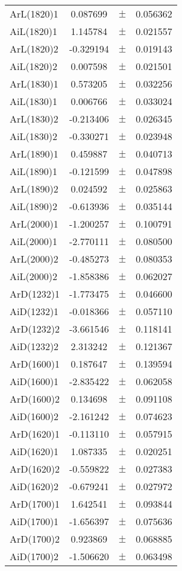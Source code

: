 \begin{table}
\begin{tiny}
\begin{tabular}{lccc}
ArL(1820)1 & 0.087699 & $\pm$ & 0.056362 \\
AiL(1820)1 & 1.145784 & $\pm$ & 0.021557 \\
ArL(1820)2 & -0.329194 & $\pm$ & 0.019143 \\
AiL(1820)2 & 0.007598 & $\pm$ & 0.021501 \\
ArL(1830)1 & 0.573205 & $\pm$ & 0.032256 \\
AiL(1830)1 & 0.006766 & $\pm$ & 0.033024 \\
ArL(1830)2 & -0.213406 & $\pm$ & 0.026345 \\
AiL(1830)2 & -0.330271 & $\pm$ & 0.023948 \\
ArL(1890)1 & 0.459887 & $\pm$ & 0.040713 \\
AiL(1890)1 & -0.121599 & $\pm$ & 0.047898 \\
ArL(1890)2 & 0.024592 & $\pm$ & 0.025863 \\
AiL(1890)2 & -0.613936 & $\pm$ & 0.035144 \\
ArL(2000)1 & -1.200257 & $\pm$ & 0.100791 \\
AiL(2000)1 & -2.770111 & $\pm$ & 0.080500 \\
ArL(2000)2 & -0.485273 & $\pm$ & 0.080353 \\
AiL(2000)2 & -1.858386 & $\pm$ & 0.062027 \\
ArD(1232)1 & -1.773475 & $\pm$ & 0.046600 \\
AiD(1232)1 & -0.018366 & $\pm$ & 0.057110 \\
ArD(1232)2 & -3.661546 & $\pm$ & 0.118141 \\
AiD(1232)2 & 2.313242 & $\pm$ & 0.121367 \\
ArD(1600)1 & 0.187647 & $\pm$ & 0.139594 \\
AiD(1600)1 & -2.835422 & $\pm$ & 0.062058 \\
ArD(1600)2 & 0.134698 & $\pm$ & 0.091108 \\
AiD(1600)2 & -2.161242 & $\pm$ & 0.074623 \\
ArD(1620)1 & -0.113110 & $\pm$ & 0.057915 \\
AiD(1620)1 & 1.087335 & $\pm$ & 0.020251 \\
ArD(1620)2 & -0.559822 & $\pm$ & 0.027383 \\
AiD(1620)2 & -0.679241 & $\pm$ & 0.027972 \\
ArD(1700)1 & 1.642541 & $\pm$ & 0.093844 \\
AiD(1700)1 & -1.656397 & $\pm$ & 0.075636 \\
ArD(1700)2 & 0.923869 & $\pm$ & 0.068885 \\
AiD(1700)2 & -1.506620 & $\pm$ & 0.063498 \\
\bottomrule
\end{tabular}
\end{tiny}
\end{table}

